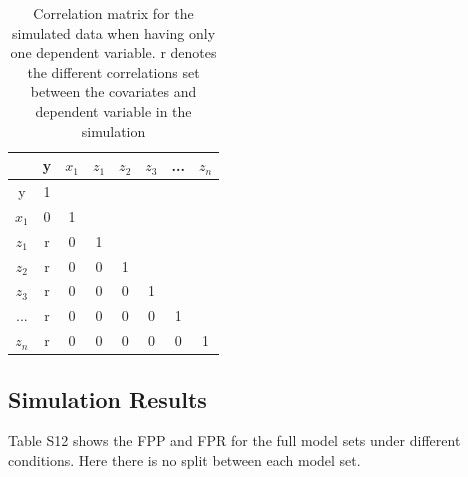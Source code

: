 \begin{table}[H]
\caption{}
\centering
\caption*{Correlation matrix for the simulated data when having only one dependent variable. r denotes the different correlations set between the covariates and dependent variable in the simulation}
\begin{tabular}{c|ccccccc} 
\toprule
 & y & $x_1$ & $z_1$ & $z_2$ & $z_3$ & ... & $z_n$ \\ 
 \midrule
y & 1 &  &  &  &  &  &  \\ 
$x_1$ & 0 & 1 &  &  &  &  &  \\ 
$z_1$ & r & 0 & 1 &  &  &  &  \\  
$z_2$ & r & 0 & 0 & 1 &  &  &  \\  
$z_3$ & r & 0 & 0 & 0 & 1 &  &  \\  
... & r & 0 & 0 & 0 & 0 & 1 &  \\ 
$z_n$ & r & 0 & 0 & 0 & 0 & 0 & 1 \\ 
\bottomrule
\end{tabular}
\end{table}

\subsection{Simulation Results}
Table S12 shows the FPP and FPR for the full model sets under different conditions. Here there is no split between each model set.




